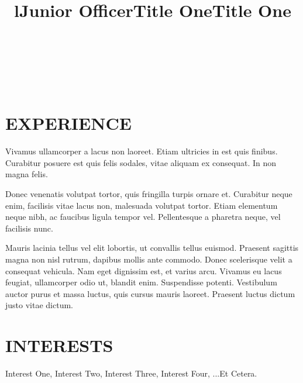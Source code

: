 \documentclass[margin]{res}
\begin{document}
\begin{resume}
\begin{format}
\title{l}\\
\\
\body\\
\end{format}

\section{EXPERIENCE}
\title{\textbf{Junior Officer}}
\begin{position}
Vivamus ullamcorper a lacus non laoreet. Etiam ultricies in est quis finibus. 
Curabitur posuere est quis felis sodales, vitae aliquam ex consequat. In non 
magna felis.
\end{position}

\title{\textbf{Title One}}
\begin{position}
Donec venenatis volutpat tortor, quis fringilla turpis ornare et. Curabitur 
neque enim, facilisis vitae lacus non, malesuada volutpat tortor. Etiam 
elementum neque nibh, ac faucibus ligula tempor vel. Pellentesque a pharetra 
neque, vel facilisis nunc.
\end{position}

\title{\textbf{Title One}}
\begin{position}
Mauris lacinia tellus vel elit lobortis, ut convallis tellus euismod. Praesent 
sagittis magna non nisl rutrum, dapibus mollis ante commodo. Donec scelerisque 
velit a consequat vehicula. Nam eget dignissim est, et varius arcu. Vivamus eu 
lacus feugiat, ullamcorper odio ut, blandit enim. Suspendisse potenti. 
Vestibulum auctor purus et massa luctus, quis cursus mauris laoreet. Praesent 
luctus dictum justo vitae dictum.
\end{position}
\section{INTERESTS}
Interest One, Interest Two, Interest Three, Interest Four, ...Et Cetera.
\end{resume}
\end{document}

